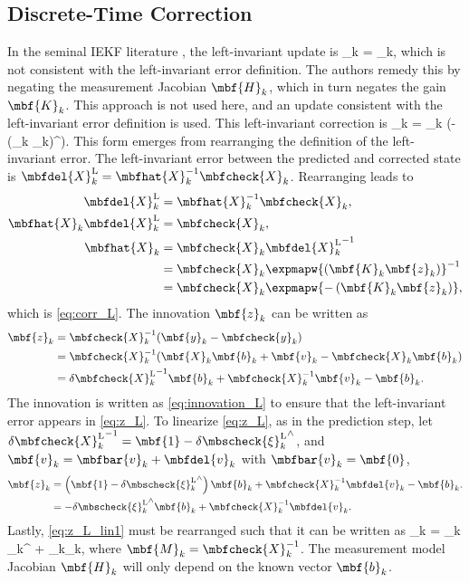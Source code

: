 \subsection{Discrete-Time Correction}

In the seminal IEKF literature \cite{Barrau2017}, the left-invariant update is
\bdis
	_k = _k,
\edis
which is not consistent with the left-invariant error definition. The authors remedy this by negating the measurement Jacobian $\mbf{H}_k$, which in turn negates the gain $\mbf{K}_k$. This approach is not used here, and an update consistent with the left-invariant error definition is used. This left-invariant correction is 
\beq
	_k = _k \exp\left(-\left(_k _k\right)^\wedge\right).
	\label{eq:corr_L} 
\eeq
This form emerges from rearranging the definition of the left-invariant error. The left-invariant error between the predicted and corrected state is $\mbfdel{X}_k^\mathrm{L} = \mbfhat{X}_k^{-1}\mbfcheck{X}_k$. Rearranging leads to
\begin{align}
	\mbfdel{X}_k^\mathrm{L} &= \mbfhat{X}_k^{-1}\mbfcheck{X}_k, \notag \\
	\mbfhat{X}_k\mbfdel{X}_k^\mathrm{L} &= \mbfcheck{X}_k, \notag \\
	\mbfhat{X}_k &=  \mbfcheck{X}_k{\mbfdel{X}_k^\mathrm{L}}^{-1} \notag \\
	&=  \mbfcheck{X}_k\expmapw{\left(\mbf{K}_k\mbf{z}_k\right)}^{-1} \notag \\
	&=  \mbfcheck{X}_k\expmapw{-\left(\mbf{K}_k\mbf{z}_k\right)}, \notag
\end{align}
which is \eqref{eq:corr_L}.
The innovation $\mbf{z}_k$ can be written as
\begin{align}
	\mbf{z}_k & = \mbfcheck{X}_k^{-1}(\mbf{y}_k - \mbfcheck{y}_k) \label{eq:innovation_L} \\ 
	& = \mbfcheck{X}_k^{-1}( \mbf{X}_k\mbf{b}_k + \mbf{v}_k - \mbfcheck{X}_k\mbf{b}_k) \nonumber \\
	& = {\delta \mbfcheck{X}_k^\mathrm{L}}^{-1}\mbf{b}_k + \mbfcheck{X}_k^{-1}\mbf{v}_k - \mbf{b}_k. \label{eq:z_L}
\end{align}
The innovation is written as \eqref{eq:innovation_L} to ensure that the left-invariant error appears in \eqref{eq:z_L}.
To linearize \eqref{eq:z_L}, as in the prediction step, let $\delta {\mbfcheck{X}_k^\mathrm{L}}^{-1} = \mbf{1} -\delta  {\mbscheck{\xi}_k^\mathrm{L}}^\wedge$, and $\mbf{v}_k = \mbfbar{v}_k + \mbfdel{v}_k$ with $\mbfbar{v}_k = \mbf{0}$,
\begin{align}
	\mbf{z}_k &=  \left(\mbf{1} -\delta  {\mbscheck{\xi}_k^\mathrm{L}}^\wedge\right)\mbf{b}_k + \mbfcheck{X}_k^{-1}\mbfdel{v}_k - \mbf{b}_k. \\
	 &=  -\delta  {\mbscheck{\xi}_k^\mathrm{L}}^\wedge\mbf{b}_k + \mbfcheck{X}_k^{-1}\mbfdel{v}_k. \label{eq:z_L_lin1}
\end{align}
Lastly, \eqref{eq:z_L_lin1} must be rearranged such that it can be written as 
\beq
	_k = _k \delta \mbscheck{\xi}_k^{} + _k_k,
\label{eq:E_L_k_lin}
\eeq
where $\mbf{M}_k = \mbfcheck{X}_k^{-1}$. The measurement model Jacobian $\mbf{H}_k$ will only depend on the known vector $\mbf{b}_k$.  

